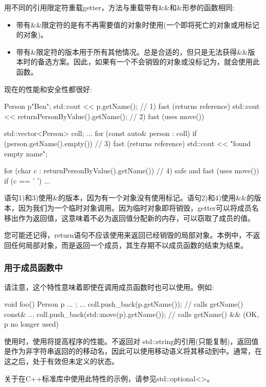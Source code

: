用不同的引用限定符重载getter，方法与重载带有\&\&和\&形参的函数相同:

\begin{itemize}
	\item 带有\&\&限定符的是有不再需要值的对象时使用(一个即将死亡的对象或用标记的对象)。
	\item 带有\&限定符的版本用于所有其他情况。总是合适的，但只是无法获得\&\&版本时的备选方案。因此，如果有一个不会销毁的对象或没标记为，就会使用此函数。
\end{itemize}

现在的性能和安全性都很好:

\begin{cppcode}
Person p{"Ben"};
std::cout << p.getName(); // 1) fast (returns reference)
std::cout << returnPersonByValue().getName(); // 2) fast (uses move())

std::vector<Person> coll;
...
for (const auto& person : coll) {
	if (person.getName().empty()) { // 3) fast (returns reference)
		std::cout << "found empty name\n";
	}
}

for (char c : returnPersonByValue().getName()) { // 4) safe and fast (uses move())
	if (c == ' ') {
		...
	}
}
\end{cppcode}

语句1)和3)使用\&的版本，因为有一个对象没有使用标记。语句2)和4)使用\&\&的版本，因为我们为一个临时对象调用。因为临时对象即将销毁，getter可以将成员名移出作为返回值，这意味着不必为返回值分配新的内存，可以窃取了成员的值。

您可能还记得，return语句不应该使用来返回已经销毁的局部对象。本例中，不返回任何局部对象，而是返回一个成员，其生存期不以成员函数的结束为结束。

\subsubsection{用于成员函数中}

请注意，这个特性意味着即使在调用成员函数时也可以使用。例如:

\begin{cppcode}
void foo()
{
	Person p{ ... };
	...
	coll.push_back(p.getName()); // calls getName() const&
	...
	coll.push_back(std::move(p).getName()); // calls getName() && (OK, p no longer used)
}
\end{cppcode}

使用时，使用将提高程序的性能。不返回对 std::string的引用(只能复制)，返回值是作为非字符串返回的的移动名，因此可以使用移动语义将其移动到中。通常，在这之后，处于有效但未定义的状态。

关于在C++标准库中使用此特性的示例，请参见std::optional<>。
















